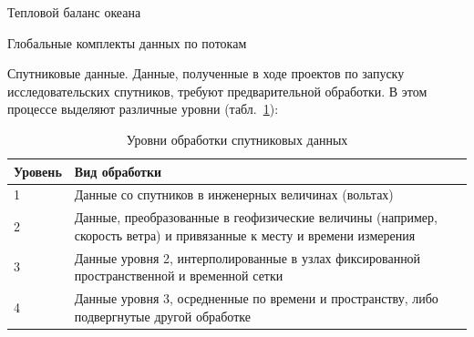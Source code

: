 \begin{chapter}{Тепловой баланс океана}
\begin{section}{Глобальные комплекты данных по потокам}
\begin{paragraph}{Спутниковые данные.}
Данные, полученные в ходе проектов по запуску исследовательских спутников,
требуют предварительной обработки. В этом процессе выделяют различные 
уровни (табл.~\ref{tbl:DataProcLvl}):
%
\begin{table}[h]
\caption{Уровни обработки спутниковых данных}\label{tbl:DataProcLvl}
\begin{tabular}{lp{}}
\hline
Уровень & Вид обработки\\
\hline
1       & Данные со спутников в инженерных величинах (вольтах)\\
2       & Данные, преобразованные в геофизические величины 
          (например, скорость ветра)
          и привязанные к месту и времени измерения\\
3       & Данные уровня 2, интерполированные в узлах фиксированной 
          пространственной и временной сетки\\
4       & Данные уровня 3, осредненные по времени и пространству, либо 
          подвергнутые другой обработке\\
\hline
\end{tabular}
\end{table}
%


\end{paragraph}
\end{section}
\end{chapter}

